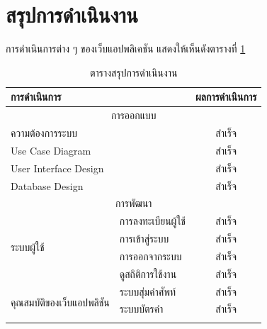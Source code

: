 \documentclass[12pt,oneside,openright,a4paper]{cpe-thai-project}
\begin{document}
\section{สรุปการดำเนินงาน}
\hspace{1cm}
การดำเนินการต่าง ๆ ของเว็บแอปพลิเคชัน แสดงให้เห็นดังตารางที่ \ref{tbl:Summary}
\begin{table}[h]\centering
	\caption{ตารางสรุปการดำเนินงาน}\label{tbl:Summary}	
	\begin{tabular}{|llc|}
		\hline
		\multicolumn{2}{|l|}{การดำเนินการ}                           & \multicolumn{1}{l|}{ผลการดำเนินการ}          \\ \hline
		\multicolumn{3}{|c|}{การออกแบบ}                                                                         \\ \hline
		\multicolumn{2}{|l|}{ความต้องการระบบ}                       & สำเร็จ                                       \\ \hline
		\multicolumn{2}{|l|}{Use Case Diagram}                     & สำเร็จ                                       \\ \hline
		\multicolumn{2}{|l|}{User Interface Design}                & สำเร็จ                                       \\ \hline
		\multicolumn{2}{|l|}{Database Design}                      & สำเร็จ                                       \\ \hline
		\multicolumn{3}{|c|}{การพัฒนา}                                                                           \\ \hline
		\multicolumn{1}{|l|}{\multirow{4}{*}{ระบบผู้ใช้}}             & \multicolumn{1}{l|}{การลงทะเบียนผู้ใช้} & สำเร็จ \\ \cline{2-3}
		\multicolumn{1}{|l|}{}                                     & \multicolumn{1}{l|}{การเข้าสู่ระบบ}    & สำเร็จ \\ \cline{2-3}
		\multicolumn{1}{|l|}{}                                     & \multicolumn{1}{l|}{การออกจากระบบ}  & สำเร็จ \\ \cline{2-3}
		\multicolumn{1}{|l|}{}                                     & \multicolumn{1}{l|}{ดูสถิติการใช้งาน}   & สำเร็จ \\ \hline
		\multicolumn{1}{|l|}{\multirow{7}{*}{คุณสมบัติของเว็บแอปพลิชัน}} & \multicolumn{1}{l|}{ระบบสุ่มคำศัพท์}     & สำเร็จ \\ \cline{2-3}
		\multicolumn{1}{|l|}{}                                     & \multicolumn{1}{l|}{ระบบบัตรคำ}       & สำเร็จ \\ \cline{2-3}

\end{tabular}
\end{table}
\end{document}
